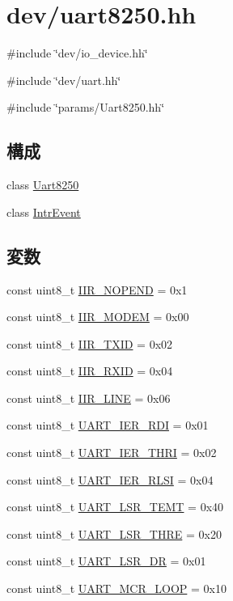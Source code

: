 \hypertarget{uart8250_8hh}{
\section{dev/uart8250.hh}
\label{uart8250_8hh}
}
{\ttfamily \#include \char`\"{}dev/io\_\-device.hh\char`\"{}}\par
{\ttfamily \#include \char`\"{}dev/uart.hh\char`\"{}}\par
{\ttfamily \#include \char`\"{}params/Uart8250.hh\char`\"{}}\par
\subsection*{構成}
\begin{DoxyCompactItemize}
\item 
class \hyperlink{classUart8250}{Uart8250}
\item 
class \hyperlink{classUart8250_1_1IntrEvent}{IntrEvent}
\end{DoxyCompactItemize}
\subsection*{変数}
\begin{DoxyCompactItemize}
\item 
const uint8\_\-t \hyperlink{uart8250_8hh_ab3553fd154cb50413c7d325db0fee164}{IIR\_\-NOPEND} = 0x1
\item 
const uint8\_\-t \hyperlink{uart8250_8hh_a5ac2543298850967bebfd13900fd395a}{IIR\_\-MODEM} = 0x00
\item 
const uint8\_\-t \hyperlink{uart8250_8hh_a83979ec692cb69b514a3223139ba6190}{IIR\_\-TXID} = 0x02
\item 
const uint8\_\-t \hyperlink{uart8250_8hh_aa23d867007b3fe8b72a15b8916cd1339}{IIR\_\-RXID} = 0x04
\item 
const uint8\_\-t \hyperlink{uart8250_8hh_af1079c5ddaaa9e5dad93a1f960249753}{IIR\_\-LINE} = 0x06
\item 
const uint8\_\-t \hyperlink{uart8250_8hh_ab0bb1acea3f4c75dc07bae2676809eb9}{UART\_\-IER\_\-RDI} = 0x01
\item 
const uint8\_\-t \hyperlink{uart8250_8hh_a83869eca59d6a978c4f37ab4adb4f032}{UART\_\-IER\_\-THRI} = 0x02
\item 
const uint8\_\-t \hyperlink{uart8250_8hh_a9c72d83639a089a0314cb26a586a07d9}{UART\_\-IER\_\-RLSI} = 0x04
\item 
const uint8\_\-t \hyperlink{uart8250_8hh_a0c8eff709cdb4a5c86765f3d1e317e65}{UART\_\-LSR\_\-TEMT} = 0x40
\item 
const uint8\_\-t \hyperlink{uart8250_8hh_a271f84ba39006e86d34e418f6570749c}{UART\_\-LSR\_\-THRE} = 0x20
\item 
const uint8\_\-t \hyperlink{uart8250_8hh_ad4040ba52a71d1442a17f2e3ada1a1b9}{UART\_\-LSR\_\-DR} = 0x01
\item 
const uint8\_\-t \hyperlink{uart8250_8hh_aeab0a24c94613ab4f42d4258c63c1ed9}{UART\_\-MCR\_\-LOOP} = 0x10
\end{DoxyCompactItemize}


